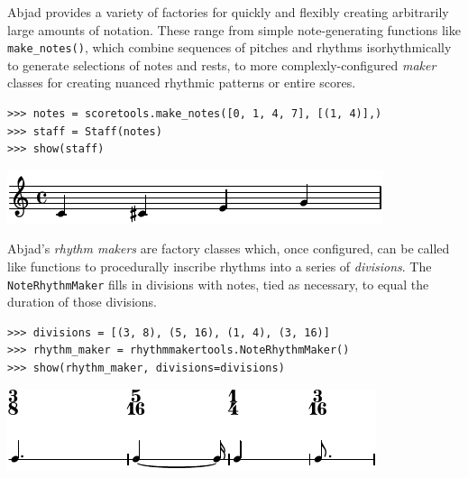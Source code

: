 \documentclass{article}
\begin{document}
Abjad provides a variety of factories for quickly and flexibly
creating arbitrarily large amounts of notation. These range from simple
note-generating functions like \texttt{make\_notes()}, which combine sequences
of pitches and rhythms isorhythmically to generate selections of notes and
rests, to more complexly-configured \emph{maker} classes for creating nuanced
rhythmic patterns or entire scores.

\begin{lstlisting}
>>> notes = scoretools.make_notes([0, 1, 4, 7], [(1, 4)],)
>>> staff = Staff(notes)
>>> show(staff)
\end{lstlisting}
\includegraphics{assets/lilypond-64155bcaa384109d40ae2616a2224dd1.pdf}

\noindent Abjad's \emph{rhythm makers} are factory classes which, once
configured, can be called like functions to procedurally inscribe rhythms into
a series of \emph{divisions}. The \texttt{NoteRhythmMaker} fills in divisions
with notes, tied as necessary, to equal the duration of those divisions.

\begin{lstlisting}
>>> divisions = [(3, 8), (5, 16), (1, 4), (3, 16)]
>>> rhythm_maker = rhythmmakertools.NoteRhythmMaker()
>>> show(rhythm_maker, divisions=divisions)
\end{lstlisting}
\includegraphics{assets/lilypond-af2aa88dc88360a6a0cf5c3f8da17b85.pdf}
\end{document}
